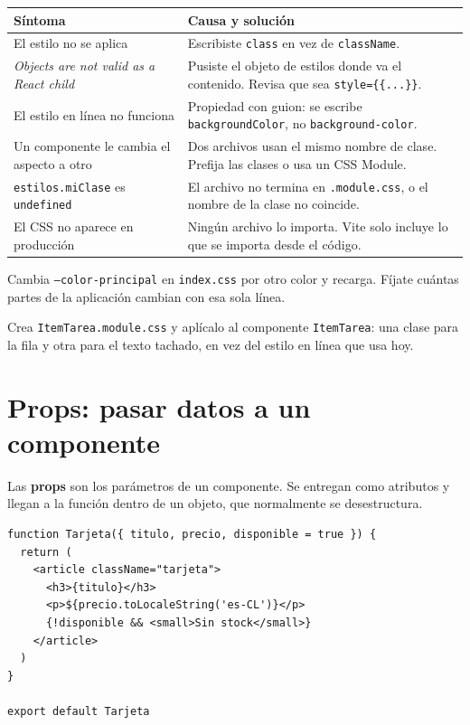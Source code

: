 \documentclass[11pt,a4paper]{article}
\newcommand{\cmd}[1]{\texttt{\color{reactdark}#1}}
\begin{document}
\begin{center}
\small
\begin{tabular}{p{5.2cm} p{8.6cm}}
\toprule
\textbf{Síntoma} & \textbf{Causa y solución} \\
\midrule
El estilo no se aplica & Escribiste \cmd{class} en vez de \cmd{className}. \\
\addlinespace
\emph{Objects are not valid as a React child} & Pusiste el objeto de estilos donde va el contenido. Revisa que sea \cmd{style=\{\{...\}\}}. \\
\addlinespace
El estilo en línea no funciona & Propiedad con guion: se escribe \cmd{backgroundColor}, no \cmd{background-color}. \\
\addlinespace
Un componente le cambia el aspecto a otro & Dos archivos usan el mismo nombre de clase. Prefija las clases o usa un CSS Module. \\
\addlinespace
\cmd{estilos.miClase} es \cmd{undefined} & El archivo no termina en \cmd{.module.css}, o el nombre de la clase no coincide. \\
\addlinespace
El CSS no aparece en producción & Ningún archivo lo importa. Vite solo incluye lo que se importa desde el código. \\
\bottomrule
\end{tabular}
\end{center}

\begin{ejercicio}[de estilos 1]
Cambia \cmd{--color-principal} en \cmd{index.css} por otro color y recarga. Fíjate cuántas partes de la aplicación cambian con esa sola línea.
\end{ejercicio}

\begin{ejercicio}[de estilos 2]
Crea \cmd{ItemTarea.module.css} y aplícalo al componente \cmd{ItemTarea}: una clase para la fila y otra para el texto tachado, en vez del estilo en línea que usa hoy.
\end{ejercicio}


\section{Props: pasar datos a un componente}

Las \textbf{props} son los parámetros de un componente. Se entregan como atributos y llegan a la función dentro de un objeto, que normalmente se desestructura.

\begin{lstlisting}[language=JSX,title={\small\ttfamily src/components/Tarjeta.jsx}]
function Tarjeta({ titulo, precio, disponible = true }) {
  return (
    <article className="tarjeta">
      <h3>{titulo}</h3>
      <p>${precio.toLocaleString('es-CL')}</p>
      {!disponible && <small>Sin stock</small>}
    </article>
  )
}

export default Tarjeta
\end{lstlisting}
\end{document}
